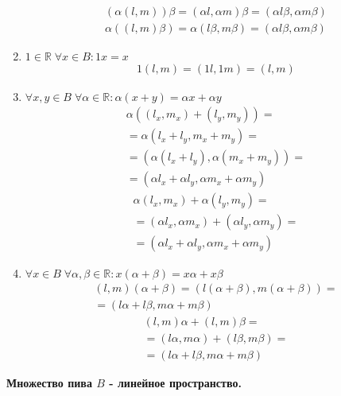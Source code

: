 \begin{enumerate}
{\begin{align*}
              (\alpha(l,m))\beta=(\alpha l, \alpha m)\beta = (\alpha l \beta,\alpha m \beta) \\
              \alpha((l,m)\beta)=\alpha (l \beta, m\beta) = (\alpha l \beta,\alpha m\beta)
          \end{align*}
          }
    \item {
          $1\in \mathbb{R}\;\forall x \in B: 1x = x$
          \begin{align*}
              1(l,m) = (1l,1m) = (l,m)
          \end{align*}
          }
    \item {
          $\forall x,y \in B \; \forall \alpha \in \mathbb{R}:\alpha(x+y)=\alpha x + \alpha y$
          \begin{align*}
              \alpha\left((l_x,m_x) + (l_y, m_y)\right)=           \\
              =\alpha\left(l_x + l_y, m_x + m_y\right)=            \\
              =\left(\alpha(l_x + l_y), \alpha (m_x + m_y)\right)= \\
              =\left(\alpha l_x + \alpha l_y, \alpha m_x + \alpha m_y\right)
          \end{align*}
          \begin{align*}
              \alpha(l_x,m_x) + \alpha(l_y, m_y)=                    \\
              =(\alpha l_x, \alpha m_x) + (\alpha l_y, \alpha m_y) = \\
              =(\alpha l_x + \alpha l_y, \alpha m_x + \alpha m_y)
          \end{align*}
          }
    \item {
          $\forall x \in B \; \forall \alpha,\beta \in \mathbb{R} : x(\alpha + \beta) = x\alpha + x\beta$
          \begin{align*}
              (l,m)(\alpha + \beta) = (l(\alpha + \beta),m(\alpha + \beta))= \\
              =(l\alpha + l\beta,m\alpha + m\beta)
          \end{align*}
          \begin{align*}
              (l,m)\alpha + (l,m)\beta =               \\
              = (l\alpha, m\alpha) + (l\beta, m\beta)= \\
              =(l\alpha + l\beta,m\alpha + m\beta)
          \end{align*}
          }
\end{enumerate}
\textbf{Множество пива $B$ - линейное пространство.}
